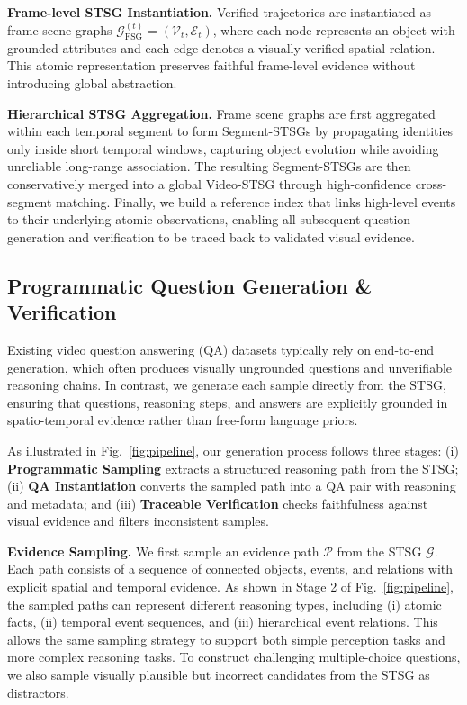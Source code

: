 \documentclass[letterpaper]{article} %
\begin{document}
\noindent\textbf{Frame-level STSG Instantiation.}
Verified trajectories are instantiated as frame scene graphs
$\mathcal{G}_{\text{FSG}}^{(t)}=(\mathcal{V}_t,\mathcal{E}_t)$,
where each node represents an object with grounded attributes and each edge denotes a visually verified spatial relation.
This atomic representation preserves faithful frame-level evidence without introducing global abstraction.

\noindent\textbf{Hierarchical STSG Aggregation.}
Frame scene graphs are first aggregated within each temporal segment to form Segment-STSGs by propagating identities only inside short temporal windows, capturing object evolution while avoiding unreliable long-range association.
The resulting Segment-STSGs are then conservatively merged into a global Video-STSG through high-confidence cross-segment matching.
Finally, we build a reference index that links high-level events to their underlying atomic observations, enabling all subsequent question generation and verification to be traced back to validated visual evidence.

\subsection{Programmatic Question Generation \& Verification}

Existing video question answering (QA) datasets typically rely on end-to-end generation, which often produces visually ungrounded questions and unverifiable reasoning chains. In contrast, we generate each sample directly from the STSG, ensuring that questions, reasoning steps, and answers are explicitly grounded in spatio-temporal evidence rather than free-form language priors.

As illustrated in Fig.~\ref{fig:pipeline}, our generation process follows three stages: (i) \textbf{Programmatic Sampling} extracts a structured reasoning path from the STSG; (ii) \textbf{QA Instantiation} converts the sampled path into a QA pair with reasoning and metadata; and (iii) \textbf{Traceable Verification} checks faithfulness against visual evidence and filters inconsistent samples.

\noindent\textbf{Evidence Sampling.}
We first sample an evidence path $\mathcal{P}$ from the STSG $\mathcal{G}$. Each path consists of a sequence of connected objects, events, and relations with explicit spatial and temporal evidence. As shown in Stage 2 of Fig.~\ref{fig:pipeline}, the sampled paths can represent different reasoning types, including (i) atomic facts, (ii) temporal event sequences, and (iii) hierarchical event relations. This allows the same sampling strategy to support both simple perception tasks and more complex reasoning tasks. To construct challenging multiple-choice questions, we also sample visually plausible but incorrect candidates from the STSG as distractors.
\end{document}

